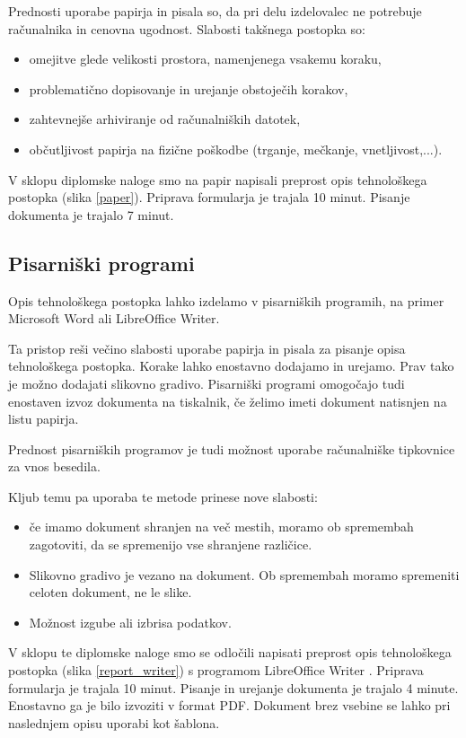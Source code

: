 \documentclass[a4paper, 12pt]{book}
\begin{document}
Prednosti uporabe papirja in pisala so, da pri delu izdelovalec ne potrebuje računalnika in cenovna ugodnost.
Slabosti takšnega postopka so:
\begin{itemize}
	\item omejitve glede velikosti prostora, namenjenega vsakemu koraku,
	\item problematično dopisovanje in urejanje obstoječih korakov,
	\item zahtevnejše arhiviranje od računalniških datotek,
	\item občutljivost papirja na fizične poškodbe (trganje, mečkanje, vnetljivost,...).
\end{itemize}

V sklopu diplomske naloge smo na papir napisali preprost opis tehnološkega postopka (slika \ref{paper}).
Priprava formularja je trajala 10 minut.
Pisanje dokumenta je trajalo 7 minut.

\subsection{Pisarniški programi}

Opis tehnološkega postopka lahko izdelamo v pisarniških programih, na primer Microsoft Word ali LibreOffice Writer.

Ta pristop reši večino slabosti uporabe papirja in pisala za pisanje opisa tehnološkega postopka.
Korake lahko enostavno dodajamo in urejamo.
Prav tako je možno dodajati slikovno gradivo.
Pisarniški programi omogočajo tudi enostaven izvoz dokumenta na tiskalnik, če želimo imeti dokument natisnjen na listu papirja.

Prednost pisarniških programov je tudi možnost uporabe računalniške tipkovnice za vnos besedila.

Kljub temu pa uporaba te metode prinese nove slabosti:
\begin{itemize}
	\item če imamo dokument shranjen na več mestih, moramo ob spremembah zagotoviti, da se spremenijo vse shranjene različice. 
	\item Slikovno gradivo je vezano na dokument. Ob spremembah moramo spremeniti celoten dokument, ne le slike.
	\item Možnost izgube ali izbrisa podatkov.
\end{itemize}

V sklopu te diplomske naloge smo se odločili napisati preprost opis tehnološkega postopka (slika \ref{report_writer}) s programom LibreOffice Writer \cite{writer}.
Priprava formularja je trajala 10 minut.
Pisanje in urejanje dokumenta je trajalo 4 minute.
Enostavno ga je bilo izvoziti v format PDF.
Dokument brez vsebine se lahko pri naslednjem opisu uporabi kot šablona.
\end{document}
